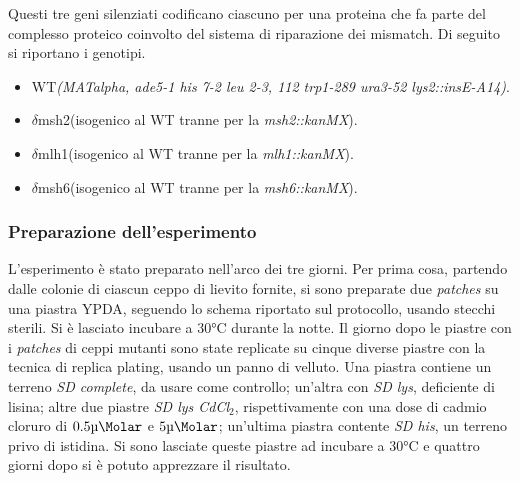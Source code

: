 	Questi tre geni silenziati codificano ciascuno per una proteina che fa parte del complesso proteico coinvolto del sistema di riparazione dei mismatch. 
	Di seguito si riportano i genotipi. 
	\begin{itemize}
		\item WT\emph{(MATalpha, ade5-1 his 7-2 leu 2-3, 112 trp1-289 ura3-52 lys2::insE-A14)}.
		\item $\delta$msh2(isogenico al WT tranne per la \emph{msh2::kanMX}).
		\item $\delta$mlh1(isogenico al WT tranne per la \emph{mlh1::kanMX}).
		\item $\delta$msh6(isogenico al WT tranne per la \emph{msh6::kanMX}).
	\end{itemize}
 
 
	\subsubsection*{Preparazione dell'esperimento}
	L'esperimento \`e stato preparato nell'arco dei tre giorni. 
	Per prima cosa, partendo dalle colonie di ciascun ceppo di lievito fornite, si sono preparate due \emph{patches} su una piastra YPDA, seguendo lo schema riportato sul protocollo, usando stecchi sterili. 
	Si è lasciato incubare a $30\si{\celsius}$ durante la notte. 
	Il giorno dopo le piastre con i \emph{patches} di ceppi mutanti sono state replicate su cinque diverse piastre con la tecnica di replica plating, usando un panno di velluto. 
	Una piastra contiene un terreno \emph{SD complete}, da usare come controllo; un'altra con \emph{SD lys}, deficiente di lisina; altre due piastre \emph{SD lys CdCl$_{2}$}, rispettivamente con una dose di cadmio cloruro di $0.5\si{\micro\Molar}$ e $5\si{\micro\Molar}$; un'ultima piastra contente \emph{SD his}, un terreno privo di istidina. 
	Si sono lasciate queste piastre ad incubare a $30\si{\celsius}$ e quattro giorni dopo si è potuto apprezzare il risultato.
 
